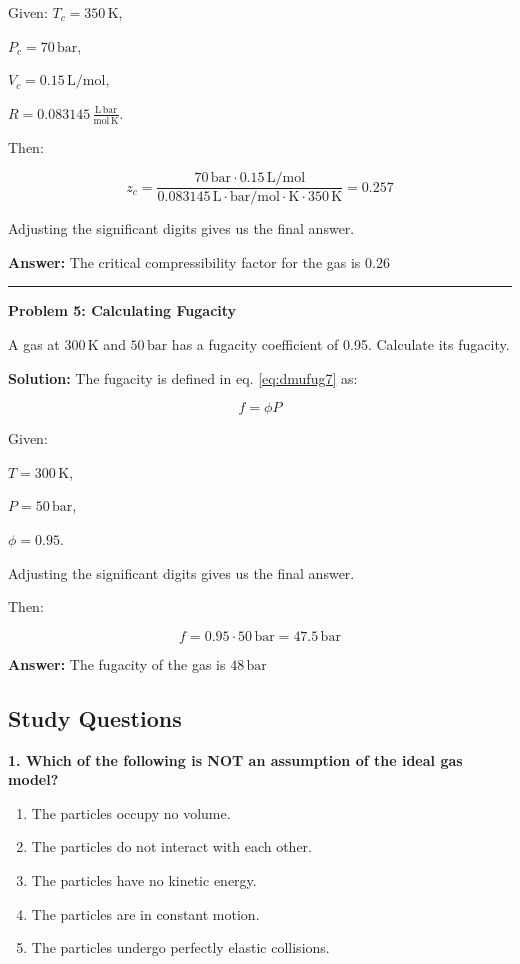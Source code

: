 \documentclass[
  9pt,
]{extbook}
\providecommand{\tightlist}{%
  \setlength{\itemsep}{0pt}\setlength{\parskip}{0pt}}
\theoremstyle{definition}
\theoremstyle{definition}
\theoremstyle{definition}
\theoremstyle{definition}
\theoremstyle{remark}
\begin{document}
Given:
\(T_c = 350\,\text{K}\),

\(P_c = 70\,\text{bar}\),

\(V_c = 0.15\,\text{L}/\text{mol}\),

\(R = 0.083145\,\frac{\text{L}\,\text{bar}}{\text{mol}\,\text{K}}\).

Then:

\[z_c = \frac{70\,\text{bar} \cdot 0.15\,\text{L}/\text{mol}}{0.083145\,\text{L}\cdot\text{bar}/\text{mol}\cdot\text{K} \cdot 350\,\text{K}}=0.257\]

Adjusting the significant digits gives us the final answer.

\textbf{Answer:} The critical compressibility factor for the gas is \(0.26\)

\begin{center}\rule{0.5\linewidth}{0.5pt}\end{center}

\textbf{Problem 5: Calculating Fugacity}

A gas at \(300\,\text{K}\) and \(50\,\text{bar}\) has a fugacity coefficient of 0.95. Calculate its fugacity.

\textbf{Solution:} The fugacity is defined in eq. \eqref{eq:dmufug7} as:

\[f = \phi P\]

Given:

\(T = 300\,\text{K}\),

\(P = 50\,\text{bar}\),

\(\phi = 0.95\).

Adjusting the significant digits gives us the final answer.

Then:

\[f = 0.95 \cdot 50\,\text{bar}=47.5\,\text{bar} \]

\textbf{Answer:} The fugacity of the gas is \(48\,\text{bar}\)

\subsection{Study Questions}\label{quest11}

\textbf{1. Which of the following is NOT an assumption of the ideal gas model?}

\begin{enumerate}
\def\labelenumi{\alph{enumi}.}
\tightlist
\item
  The particles occupy no volume.
\item
  The particles do not interact with each other.
\item
  The particles have no kinetic energy.
\item
  The particles are in constant motion.
\item
  The particles undergo perfectly elastic collisions.
\end{enumerate}
\end{document}
